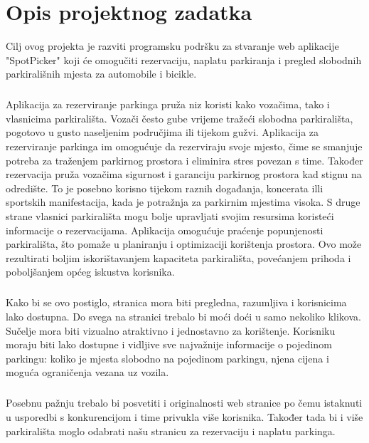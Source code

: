 \chapter{Opis projektnog zadatka}


{Cilj ovog projekta je razviti programsku podršku za stvaranje web aplikacije "SpotPicker" koji će omogučiti rezervaciju, naplatu parkiranja i pregled slobodnih parkirališnih mjesta za automobile i bicikle. }
\paragraph*{}{Aplikacija za rezerviranje parkinga pruža niz koristi kako vozačima, tako i vlasnicima parkirališta. Vozači često gube vrijeme tražeći slobodna parkirališta, pogotovo u gusto naseljenim područjima ili tijekom gužvi. Aplikacija za rezerviranje parkinga im omogućuje da rezerviraju svoje mjesto, čime se smanjuje potreba za traženjem parkirnog prostora i eliminira stres povezan s time. Također rezervacija pruža vozačima sigurnost i garanciju parkirnog prostora kad stignu na odredište. To je posebno korisno tijekom raznih događanja, koncerata illi sportskih manifestacija, kada je potražnja za parkirnim mjestima visoka. S druge strane vlasnici parkirališta mogu bolje upravljati svojim resursima koristeći informacije o rezervacijama. Aplikacija omogućuje praćenje popunjenosti parkirališta, što pomaže u planiranju i optimizaciji korištenja prostora. Ovo može rezultirati boljim iskorištavanjem kapaciteta parkirališta, povećanjem prihoda i poboljšanjem općeg iskustva korisnika.}
\paragraph*{}{Kako bi se ovo postiglo, stranica mora biti pregledna, razumljiva i korisnicima lako dostupna. Do svega na stranici trebalo bi moći doći u samo nekoliko klikova. Sučelje mora biti vizualno atraktivno i jednostavno za korištenje. Korisniku moraju biti lako dostupne i vidljive sve najvažnije informacije o pojedinom parkingu: koliko je mjesta slobodno na pojedinom parkingu, njena cijena i moguća ograničenja vezana uz vozila.}
\paragraph*{}{Posebnu pažnju trebalo bi posvetiti i originalnosti web stranice po čemu istaknuti u usporedbi s konkurencijom i time privukla više korisnika. Također tada bi i više parkirališta moglo odabrati našu stranicu za rezervaciju i naplatu parkinga.}

